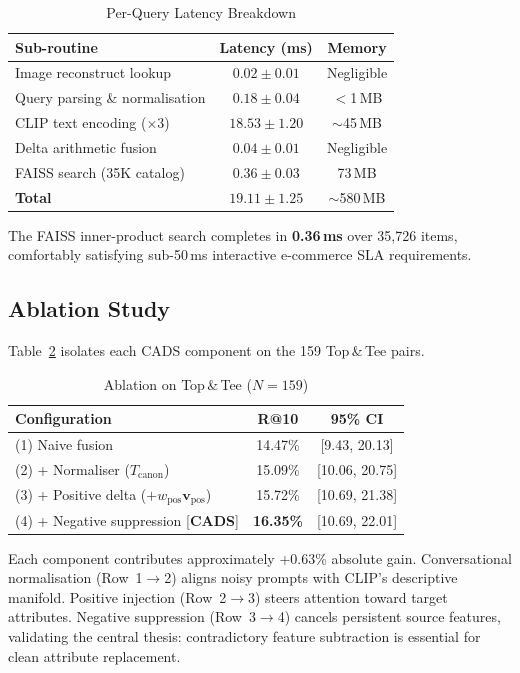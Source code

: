 \documentclass[conference]{IEEEtran}
\begin{document}
\begin{table}[!t]
\centering
\caption{Per-Query Latency Breakdown}
\label{tab:latency}
\begin{tabular}{@{}lcc@{}}
\toprule
\textbf{Sub-routine} & \textbf{Latency (ms)} & \textbf{Memory} \\ \midrule
Image reconstruct lookup       & $0.02 \pm 0.01$  & Negligible \\
Query parsing \& normalisation & $0.18 \pm 0.04$  & $<$1\,MB \\
CLIP text encoding ($\times$3) & $18.53 \pm 1.20$ & $\sim$45\,MB \\
Delta arithmetic fusion        & $0.04 \pm 0.01$  & Negligible \\
FAISS search (35K catalog)     & $0.36 \pm 0.03$  & 73\,MB \\ \midrule
\textbf{Total}                 & $\mathbf{19.11 \pm 1.25}$ & $\sim$580\,MB \\ \bottomrule
\end{tabular}
\end{table}

The FAISS inner-product search completes in \textbf{0.36\,ms} over 35{,}726 items, comfortably satisfying sub-50\,ms interactive e-commerce SLA requirements.

\subsection{Ablation Study}
Table~\ref{tab:ablation} isolates each CADS component on the 159 Top\,\&\,Tee pairs.

\begin{table}[!t]
\centering
\caption{Ablation on Top\,\&\,Tee ($N{=}159$)}
\label{tab:ablation}
\begin{tabular}{@{}lcc@{}}
\toprule
\textbf{Configuration} & \textbf{R@10} & \textbf{95\% CI} \\ \midrule
(1) Naive fusion & 14.47\% & [9.43, 20.13] \\
(2) + Normaliser ($T_{\text{canon}}$) & 15.09\% & [10.06, 20.75] \\
(3) + Positive delta ($+w_{\text{pos}}\mathbf{v}_{\text{pos}}$) & 15.72\% & [10.69, 21.38] \\
(4) + Negative suppression [\textbf{CADS}] & \textbf{16.35\%} & [10.69, 22.01] \\ \bottomrule
\end{tabular}
\end{table}

Each component contributes approximately +0.63\% absolute gain. Conversational normalisation (Row~1$\to$2) aligns noisy prompts with CLIP's descriptive manifold. Positive injection (Row~2$\to$3) steers attention toward target attributes. Negative suppression (Row~3$\to$4) cancels persistent source features, validating the central thesis: contradictory feature subtraction is essential for clean attribute replacement.
\end{document}
